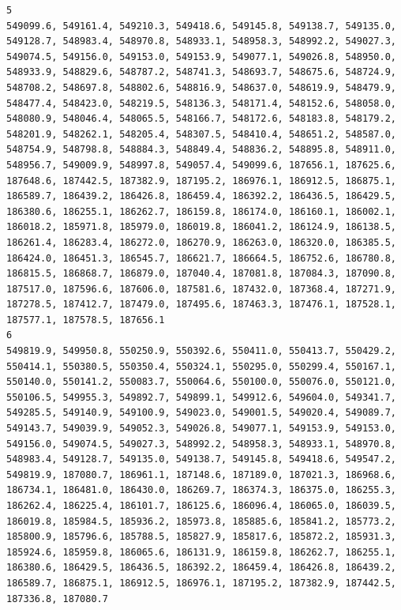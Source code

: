 \documentclass[
  letterpaper,
]{scrbook}
\begin{document}
\begin{verbatim}
5                                                                                                                                                                                     549099.6, 549161.4, 549210.3, 549418.6, 549145.8, 549138.7, 549135.0, 549128.7, 548983.4, 548970.8, 548933.1, 548958.3, 548992.2, 549027.3, 549074.5, 549156.0, 549153.0, 549153.9, 549077.1, 549026.8, 548950.0, 548933.9, 548829.6, 548787.2, 548741.3, 548693.7, 548675.6, 548724.9, 548708.2, 548697.8, 548802.6, 548816.9, 548637.0, 548619.9, 548479.9, 548477.4, 548423.0, 548219.5, 548136.3, 548171.4, 548152.6, 548058.0, 548080.9, 548046.4, 548065.5, 548166.7, 548172.6, 548183.8, 548179.2, 548201.9, 548262.1, 548205.4, 548307.5, 548410.4, 548651.2, 548587.0, 548754.9, 548798.8, 548884.3, 548849.4, 548836.2, 548895.8, 548911.0, 548956.7, 549009.9, 548997.8, 549057.4, 549099.6, 187656.1, 187625.6, 187648.6, 187442.5, 187382.9, 187195.2, 186976.1, 186912.5, 186875.1, 186589.7, 186439.2, 186426.8, 186459.4, 186392.2, 186436.5, 186429.5, 186380.6, 186255.1, 186262.7, 186159.8, 186174.0, 186160.1, 186002.1, 186018.2, 185971.8, 185979.0, 186019.8, 186041.2, 186124.9, 186138.5, 186261.4, 186283.4, 186272.0, 186270.9, 186263.0, 186320.0, 186385.5, 186424.0, 186451.3, 186545.7, 186621.7, 186664.5, 186752.6, 186780.8, 186815.5, 186868.7, 186879.0, 187040.4, 187081.8, 187084.3, 187090.8, 187517.0, 187596.6, 187606.0, 187581.6, 187432.0, 187368.4, 187271.9, 187278.5, 187412.7, 187479.0, 187495.6, 187463.3, 187476.1, 187528.1, 187577.1, 187578.5, 187656.1
6                                                                                                                                                                                                                                                                                                                                                                                                                 549819.9, 549950.8, 550250.9, 550392.6, 550411.0, 550413.7, 550429.2, 550414.1, 550380.5, 550350.4, 550324.1, 550295.0, 550299.4, 550167.1, 550140.0, 550141.2, 550083.7, 550064.6, 550100.0, 550076.0, 550121.0, 550106.5, 549955.3, 549892.7, 549899.1, 549912.6, 549604.0, 549341.7, 549285.5, 549140.9, 549100.9, 549023.0, 549001.5, 549020.4, 549089.7, 549143.7, 549039.9, 549052.3, 549026.8, 549077.1, 549153.9, 549153.0, 549156.0, 549074.5, 549027.3, 548992.2, 548958.3, 548933.1, 548970.8, 548983.4, 549128.7, 549135.0, 549138.7, 549145.8, 549418.6, 549547.2, 549819.9, 187080.7, 186961.1, 187148.6, 187189.0, 187021.3, 186968.6, 186734.1, 186481.0, 186430.0, 186269.7, 186374.3, 186375.0, 186255.3, 186262.4, 186225.4, 186101.7, 186125.6, 186096.4, 186065.0, 186039.5, 186019.8, 185984.5, 185936.2, 185973.8, 185885.6, 185841.2, 185773.2, 185800.9, 185796.6, 185788.5, 185827.9, 185817.6, 185872.2, 185931.3, 185924.6, 185959.8, 186065.6, 186131.9, 186159.8, 186262.7, 186255.1, 186380.6, 186429.5, 186436.5, 186392.2, 186459.4, 186426.8, 186439.2, 186589.7, 186875.1, 186912.5, 186976.1, 187195.2, 187382.9, 187442.5, 187336.8, 187080.7
\end{verbatim}
\end{document}
